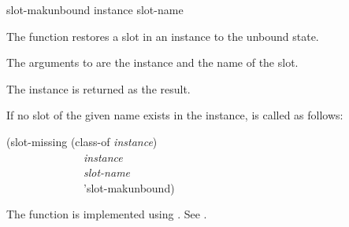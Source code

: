 \begin{defun}[Function]
slot-makunbound instance slot-name

The function  restores a slot in an instance to
the unbound state.





The arguments to  are the instance and the name of
the slot.


The instance is returned as the result.


If no slot of the given name exists in the instance, 
is called as follows:
\begin{lisp}
(slot-missing (class-of \emph{instance\/}) \\
~~~~~~~~~~~~~~\emph{instance\/} \\
~~~~~~~~~~~~~~\emph{slot-name\/} \\
~~~~~~~~~~~~~~'slot-makunbound)
\end{lisp}

The function  is implemented using 
.
See .
\end{defun}




